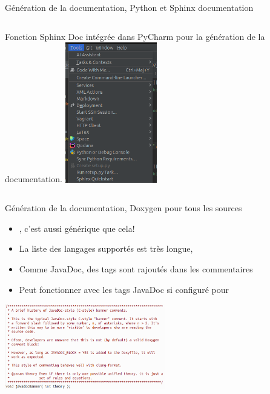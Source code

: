 \documentclass{beamer}
\begin{document}
    \begin{frame}{Génération de la documentation, Python et Sphinx documentation}
        \begin{columns}
            Fonction Sphinx Doc intégrée dans PyCharm pour la génération de la documentation.
            \centering
            \includegraphics[width=4cm]{image/sphinx-generate-button}
        \end{columns}
    \end{frame}

    \begin{frame}{Génération de la documentation, Doxygen pour tous les sources}

        \begin{itemize}

            \item {}, c'est aussi générique que cela! 
            \item La liste des langages supportés est très longue, 
            \item Comme JavaDoc, des tags sont rajoutés dans les commentaires
            \item Peut fonctionner avec les tags JavaDoc si configuré pour

        \end{itemize}
        \bigbreak

        \centering
        \includegraphics[width=7cm]{image/javadoc-with-doxygen}

    \end{frame}
\end{document}
